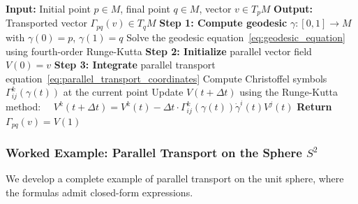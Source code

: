 \begin{algorithm}[H]
\caption{Computation of Parallel Transport on Riemannian Manifolds}
\label{alg:parallel_transport_computation}
\begin{algorithmic}[1]
    \State \textbf{Input:} Initial point $p \in M$, final point $q \in M$, vector $v \in T_p M$
    \State \textbf{Output:} Transported vector $\Gamma_{pq}(v) \in T_q M$
    \State
    \State \textbf{Step 1: Compute geodesic} $\gamma: [0,1] \to M$ with $\gamma(0) = p$, $\gamma(1) = q$
    \State Solve the geodesic equation~\eqref{eq:geodesic_equation} using fourth-order Runge-Kutta
    \State
    \State \textbf{Step 2: Initialize} parallel vector field $V(0) = v$
    \State
    \State \textbf{Step 3: Integrate} parallel transport equation~\eqref{eq:parallel_transport_coordinates}
        \State Compute Christoffel symbols $\Gamma^k_{ij}(\gamma(t))$ at the current point
        \State Update $V(t + \Delta t)$ using the Runge-Kutta method:
        \State $\quad V^k(t + \Delta t) = V^k(t) - \Delta t \cdot \Gamma^k_{ij}(\gamma(t)) \dot{\gamma}^i(t) V^j(t)$
    \EndFor
    \State
    \State \textbf{Return} $\Gamma_{pq}(v) = V(1)$
\end{algorithmic}
\end{algorithm}

\subsubsection{Worked Example: Parallel Transport on the Sphere $S^2$}

We develop a complete example of parallel transport on the unit sphere, where the formulas admit closed-form expressions.

